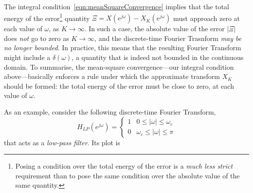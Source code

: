 \documentclass[\documentfontsize, twocolumn]{\classname}
\begin{document}
The integral condition~\ref{eqn:meanSquareConvergence} implies that the total energy of the error\footnote{Posing a condition over the total energy of the error is a \emph{much less strict} requirement than to pose the same condition over the absolute value of the same quantity.} quantity $\Xi = X(e^{j\omega}) - X_K(e^{j\omega})$ must approach zero at each value of $\omega$, as $K\rightarrow \infty$.  In such a case, the absolute value of the error $|\Xi|$ does \emph{not} go to zero as $K\rightarrow \infty$, and the discrete-time Fourier Trasnform \emph{may be no longer bounded}. In practice, this means that the resulting Fourier Transform might include a $\delta(\omega)$, a quantity that is indeed not bounded in the continuous domain. To summarise, the mean-square convergence---our integral condition above---basically enforces a rule under which the approximate transform $X_K$ should be formed: the total energy of the error must be close to zero, at each value of $\omega$.

As an example, consider the following discrete-time Fourier Transform,
\[
    H_{LP}(e^{j\omega}) = \left\{\begin{array}{ll}
        1 & 0 \leq |\omega| \leq \omega_c\\
        0 & \omega_c \leq |\omega| \leq \pi
        \end{array}\right.
\]
that acts as a \emph{low-pass filter}. Its plot is
\begin{center}
\end{center}
\end{document}
